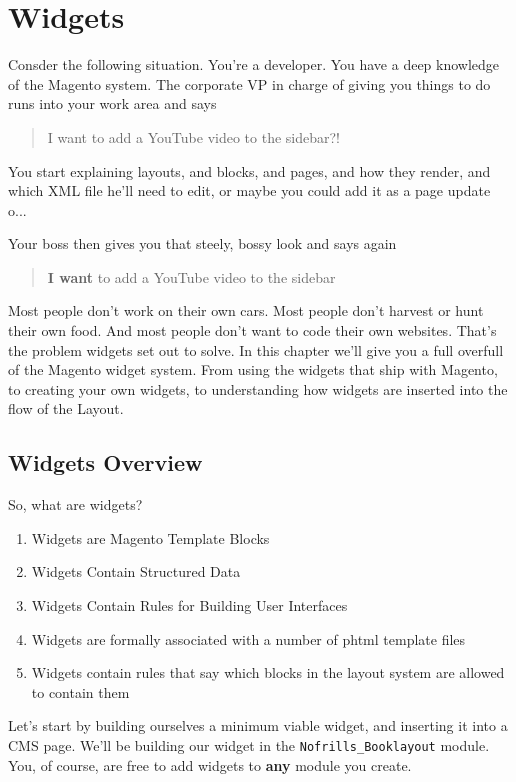 \documentclass[oneside]{book}
\begin{document}
\chapter{Widgets}
Consder the following situation. You're a developer.  You have a deep knowledge of the Magento system.  The corporate VP in charge of giving you things to do runs into your work area and says

\begin{quote}
I want to add a YouTube video to the sidebar?!
\end{quote}

You start explaining layouts, and blocks, and pages, and how they render, and which XML file he'll need to edit, or maybe you could add it as a page update o...

Your boss then gives you that steely, bossy look and says again

\begin{quote}
\textbf{I want} to add a YouTube video to the sidebar
\end{quote}

Most people don't work on their own cars.  Most people don't harvest or hunt their own food.  And most people don't want to code their own websites.  That's the problem widgets set out to solve.  In this chapter we'll give you a full overfull of the Magento widget system.  From using the widgets that ship with Magento, to creating your own widgets, to understanding how widgets are inserted into the flow of the Layout.

\section{Widgets Overview}

So, what are widgets?

\begin{enumerate}
\item Widgets are Magento Template Blocks
\item Widgets Contain Structured Data
\item Widgets Contain Rules for Building User Interfaces
\item Widgets are formally associated with a number of phtml template files
\item Widgets contain rules that say which blocks in the layout system are allowed to contain them
\end{enumerate}


Let's start by building ourselves a minimum viable widget, and inserting it into a CMS page.  We'll be building our widget in the \footnotesize\texttt{Nofrills\_Booklayout} \normalsize  module.  You, of course, are free to add widgets to \textbf{any} module you create.
\end{document}
